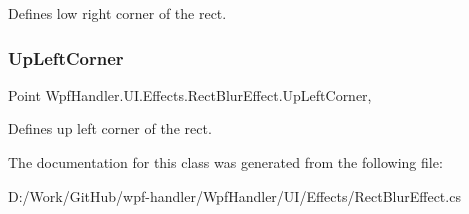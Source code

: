 Defines low right corner of the rect. 

\mbox{\label{class_wpf_handler_1_1_u_i_1_1_effects_1_1_rect_blur_effect_a7a8ff424f98797d72aa8acea72f45b89}} 
\subsubsection{\texorpdfstring{Up\+Left\+Corner}{UpLeftCorner}}
{\footnotesize\ttfamily Point Wpf\+Handler.\+U\+I.\+Effects.\+Rect\+Blur\+Effect.\+Up\+Left\+Corner\hspace{0.3cm}{\ttfamily [get]}, {\ttfamily [set]}}



Defines up left corner of the rect. 



The documentation for this class was generated from the following file\+:\begin{DoxyCompactItemize}
\item 
D\+:/\+Work/\+Git\+Hub/wpf-\/handler/\+Wpf\+Handler/\+U\+I/\+Effects/Rect\+Blur\+Effect.\+cs\end{DoxyCompactItemize}
